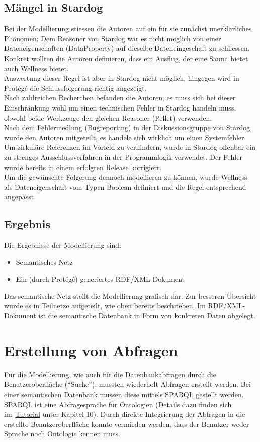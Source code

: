 \subsection{Mängel in Stardog}
\label{subsec:loesung_modellierung_maengel_stardog}
Bei der Modellierung stiessen die Autoren auf ein für sie zunächst unerklärliches Phänomen: Dem Reasoner von Stardog war es nicht möglich von einer Dateneigenschaften (DataProperty) auf dieselbe Dateneingeschaft zu schliessen. Konkret wollten die Autoren definieren, dass ein Ausflug, der eine Sauna bietet auch Wellness bietet.\\
Auswertung dieser Regel ist aber in Stardog nicht möglich, hingegen wird in Protégé die Schlussfolgerung richtig angezeigt.\\
Nach zahlreichen Recherchen befanden die Autoren, es muss sich bei dieser Einschränkung wohl um einen technischen Fehler in Stardog handeln muss, obwohl beide Werkzeuge den gleichen Reasoner (Pellet) verwenden.\\
Nach dem Fehlermedlung (Bugreporting) in der Diskussionsgruppe von Stardog, wurde den Autoren mitgeteilt, es handele sich wirklich um einen Systemfehler. Um zirkuläre Referenzen im Vorfeld zu verhindern, wurde in Stardog offenbar ein zu strenges Ausschlussverfahren in der Programmlogik verwendet. Der Fehler wurde bereits in einem erfolgten Release korrigiert.\\
Um die gewünschte Folgerung dennoch modellieren zu können, wurde Wellness als Dateneigenschaft vom Typen Boolean definiert und die Regel entsprechend angepasst.

\subsection{Ergebnis}
\label{subsec:loesung_modellierung_ergebnis}
Die Ergebnisse der Modellierung sind:
\begin{itemize}
    \item Semantisches Netz
    \item Ein (durch Protégé) generiertes RDF/XML-Dokument
\end{itemize}
Das semantische Netz stellt die Modellierung grafisch dar. Zur besseren Übersicht wurde es in Teilnetze aufgeteilt, wie oben bereits beschrieben. Im RDF/XML-Dokument ist die semantische Datenbank in Form von konkreten Daten abgelegt.

\section{Erstellung von Abfragen}
\label{sec:loesung_sparql}
Für die Modellierung, wie auch für die Datenbankabfragen durch die Benutzeroberfläche (``Suche''), mussten wiederholt Abfragen erstellt werden. Bei einer semantischen Datenbank müssen diese mittels SPARQL gestellt werden. SPARQL ist eine Abfragesprache für Ontologien (Details dazu finden sich im~\hyperref[sec:anhang:tutorial_dokument]{Tutorial} unter Kapitel 10). Durch direkte Integrierung der Abfragen in die erstellte Benutzeroberfläche konnte vermieden werden, dass der Benutzer weder Sprache noch Ontologie kennen muss.

